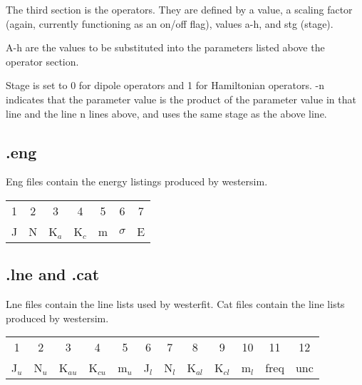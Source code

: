 \documentclass{article}
\begin{document}
The third section is the operators. They are defined by a value, a scaling factor (again, currently functioning as an on/off flag), values a-h, and stg (stage).

A-h are the values to be substituted into the parameters listed above the operator section.

Stage is set to 0 for dipole operators and 1 for Hamiltonian operators. -n indicates that the parameter value is the product of the parameter value in that line and the line n lines above, and uses the same stage as the above line.


\subsection{.eng}
	
Eng files contain the energy listings produced by westersim.
	
	\begin{tabular}{c c c c c c c}
		1 & 2 & 3 & 4 & 5 & 6 & 7 \\
		J & N & K$_a$ & K$_c$ & m & $\sigma$ & E \\
	\end{tabular}
	
\subsection{.lne and .cat}

Lne files contain the line lists used by westerfit. Cat files contain the line lists produced by westersim.


	\begin{tabular}{c c c c c c c c c c c c}
		1 & 2 & 3 & 4 & 5 & 6 & 7 & 8 & 9 & 10 & 11 & 12 \\
		J$_u$ & N$_u$ & K$_{au}$ & K$_{cu}$ & m$_u$ & J$_l$ & N$_l$ & K$_{al}$ & K$_{cl}$ & m$_l$ & freq & unc \\
	\end{tabular}


	
\end{document}
